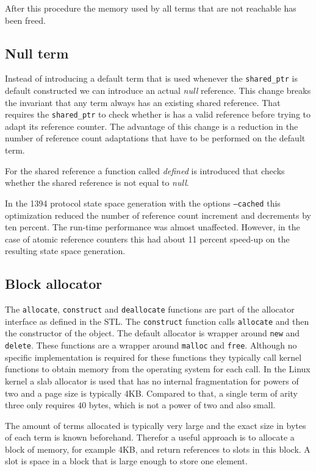 \documentclass[10pt,a4paper]{article}
\begin{document}
\noindent After this procedure the memory used by all terms that are not reachable has been freed.

\subsection{Null term}

Instead of introducing a default term that is used whenever the \texttt{shared\_ptr} is default constructed we can introduce an actual \emph{null} reference. 
This change breaks the invariant that any term always has an existing shared reference. 
That requires the \texttt{shared\_ptr} to check whether is has a valid reference before trying to adapt its reference counter. 
The advantage of this change is a reduction in the number of reference count adaptations that have to be performed on the default term.

For the shared reference a function called \emph{defined} is introduced that checks whether the shared reference is not equal to \emph{null}.

In the 1394 protocol state space generation with the options \texttt{--cached} this optimization reduced the number of reference count increment and decrements by ten percent. The run-time performance was almost unaffected. However, in the case of atomic reference counters this had about 11 percent speed-up on the resulting state space generation.

\subsection{Block allocator}

The \texttt{allocate}, \texttt{construct} and \texttt{deallocate} functions are part of the allocator interface as defined in the STL.
The \texttt{construct} function calls \texttt{allocate} and then the constructor of the object.
The default allocator is wrapper around \texttt{new} and \texttt{delete}.
These functions are a wrapper around \texttt{malloc} and \texttt{free}.
Although no specific implementation is required for these functions they typically call kernel functions to obtain memory from the operating system for each call.
In the Linux kernel a slab allocator is used that has no internal fragmentation for powers of two and a page size is typically 4KB. 
Compared to that, a single term of arity three only requires $40$ bytes, which is not a power of two and also small.

The amount of terms allocated is typically very large and the exact size in bytes of each term is known beforehand.
Therefor a useful approach is to allocate a block of memory, for example 4KB, and return references to slots in this block.
A slot is space in a block that is large enough to store one element.
 
\end{document}
